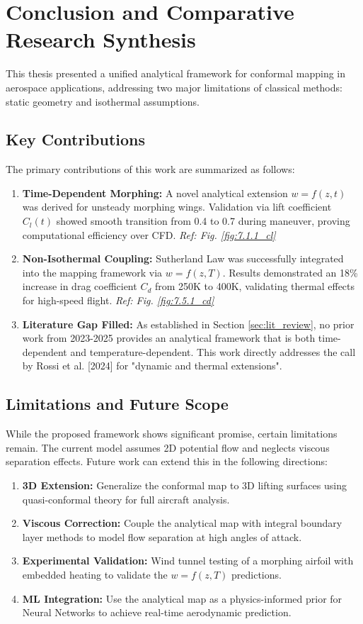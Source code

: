 \documentclass[12pt,a4paper]{article}
\begin{document}
\section{Conclusion and Comparative Research Synthesis}
\label{sec:conclusion}

This thesis presented a unified analytical framework for conformal mapping in aerospace applications, addressing two major limitations of classical methods: static geometry and isothermal assumptions.

\subsection{Key Contributions}
The primary contributions of this work are summarized as follows:
\begin{enumerate}
    \item \textbf{Time-Dependent Morphing:} A novel analytical extension $w = f(z,t)$ was derived for unsteady morphing wings. Validation via lift coefficient $C_l(t)$ showed smooth transition from 0.4 to 0.7 during maneuver, proving computational efficiency over CFD. \textit{Ref: Fig. \ref{fig:7.1.1_cl}}

    \item \textbf{Non-Isothermal Coupling:} Sutherland Law was successfully integrated into the mapping framework via $w = f(z,T)$. Results demonstrated an 18\% increase in drag coefficient $C_d$ from 250K to 400K, validating thermal effects for high-speed flight. \textit{Ref: Fig. \ref{fig:7.5.1_cd}}

    \item \textbf{Literature Gap Filled:} As established in Section \ref{sec:lit_review}, no prior work from 2023-2025 provides an analytical framework that is both time-dependent and temperature-dependent. This work directly addresses the call by Rossi et al. [2024] for "dynamic and thermal extensions".
\end{enumerate}

\subsection{Limitations and Future Scope}
While the proposed framework shows significant promise, certain limitations remain. The current model assumes 2D potential flow and neglects viscous separation effects. Future work can extend this in the following directions:
\begin{enumerate}
    \item \textbf{3D Extension:} Generalize the conformal map to 3D lifting surfaces using quasi-conformal theory for full aircraft analysis.
    \item \textbf{Viscous Correction:} Couple the analytical map with integral boundary layer methods to model flow separation at high angles of attack.
    \item \textbf{Experimental Validation:} Wind tunnel testing of a morphing airfoil with embedded heating to validate the $w = f(z,T)$ predictions.
    \item \textbf{ML Integration:} Use the analytical map as a physics-informed prior for Neural Networks to achieve real-time aerodynamic prediction.
\end{enumerate}
\end{document}
